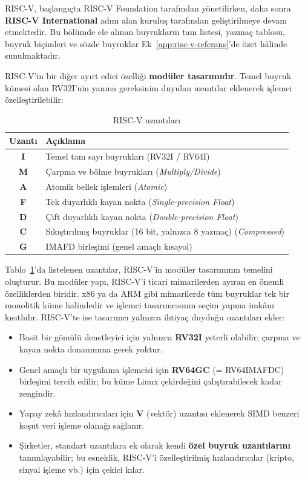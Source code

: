 RISC-V, başlangıçta RISC-V Foundation tarafından yönetilirken, daha sonra \textbf{RISC-V International} adını alan kuruluş tarafından geliştirilmeye devam etmektedir. Bu bölümde ele alınan buyrukların tam listesi, yazmaç tablosu, buyruk biçimleri ve sözde buyruklar Ek~\ref{app:risc-v-referans}'de özet hâlinde sunulmaktadır.

RISC-V'in bir diğer ayırt edici özelliği \textbf{modüler tasarımıdır}. Temel buyruk kümesi olan RV32I'nin yanına gereksinim duyulan uzantılar eklenerek işlemci özelleştirilebilir:

\begin{table}[H]
\centering
\caption{RISC-V uzantıları}
\label{tab:riscv-uzantilar}
\begin{tabular}{cl}
\toprule
\textbf{Uzantı} & \textbf{Açıklama} \\
\midrule
\textbf{I} & Temel tam sayı buyrukları (RV32I / RV64I) \\
\textbf{M} & Çarpma ve bölme buyrukları (\textit{Multiply/Divide}) \\
\textbf{A} & Atomik bellek işlemleri (\textit{Atomic}) \\
\textbf{F} & Tek duyarlıklı kayan nokta (\textit{Single-precision Float}) \\
\textbf{D} & Çift duyarlıklı kayan nokta (\textit{Double-precision Float}) \\
\textbf{C} & Sıkıştırılmış buyruklar (16 bit, yalnızca 8 yazmaç) (\textit{Compressed}) \\
\textbf{G} & IMAFD birleşimi (genel amaçlı kısayol) \\
\bottomrule
\end{tabular}
\end{table}

Tablo~\ref{tab:riscv-uzantilar}'da listelenen uzantılar, RISC-V'in modüler tasarımının temelini oluşturur. Bu modüler yapı, RISC-V'i ticari mimarilerden ayıran en önemli özelliklerden biridir. x86 ya da ARM gibi mimarilerde tüm buyruklar tek bir monolitik küme halindedir ve işlemci tasarımcısının seçim yapma imkânı kısıtlıdır. RISC-V'te ise tasarımcı yalnızca ihtiyaç duyduğu uzantıları ekler:
\begin{itemize}[nosep]
    \item Basit bir gömülü denetleyici için yalnızca \textbf{RV32I} yeterli olabilir; çarpma ve kayan nokta donanımına gerek yoktur.
    \item Genel amaçlı bir uygulama işlemcisi için \textbf{RV64GC} (= RV64IMAFDC) birleşimi tercih edilir; bu küme Linux çekirdeğini çalıştırabilecek kadar zengindir.
    \item Yapay zekâ hızlandırıcıları için \textbf{V} (vektör) uzantısı eklenerek SIMD benzeri koşut veri işleme olanağı sağlanır.
    \item Şirketler, standart uzantılara ek olarak kendi \textbf{özel buyruk uzantılarını} tanımlayabilir; bu esneklik, RISC-V'i özelleştirilmiş hızlandırıcılar (kripto, sinyal işleme vb.) için çekici kılar.
\end{itemize}


